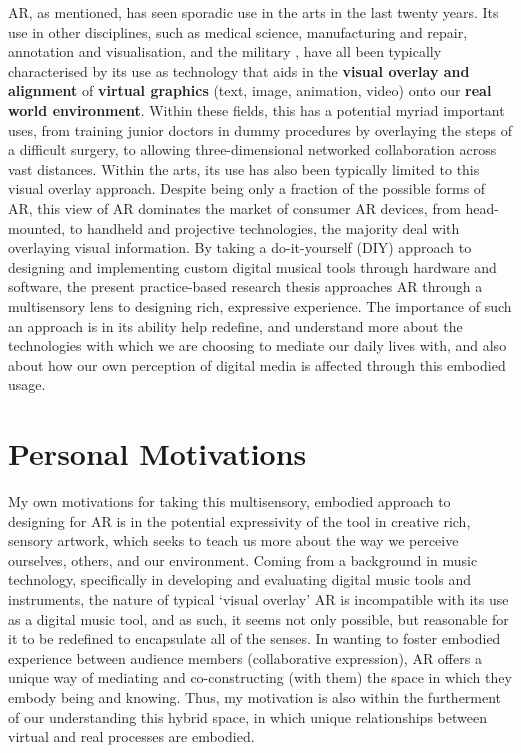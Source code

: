 AR, as mentioned, has seen sporadic use in the arts in the last twenty years. Its use in other disciplines, such as medical science, manufacturing and repair, annotation and visualisation, and the military \citep{azuma1997}, have all been typically characterised by its use as technology that aids in the \textbf{visual overlay and alignment} of \textbf{virtual graphics} (text, image, animation, video) onto our \textbf{real world environment}. Within these fields, this has a potential myriad important uses, from training junior doctors in dummy procedures by overlaying the steps of a difficult surgery, to allowing three-dimensional networked collaboration across vast distances. Within the arts, its use has also been typically limited to this visual overlay approach. Despite being only a fraction of the possible forms of AR, this view of AR dominates the market of consumer AR devices, from head-mounted, to handheld and projective technologies, the majority deal with overlaying visual information.  By taking a do-it-yourself (DIY) approach to designing and implementing custom digital musical tools through hardware and software, the present practice-based research thesis approaches AR through a multisensory lens to designing rich, expressive experience. The importance of such an approach is in its ability help redefine, and understand more about the technologies with which we are choosing to mediate our daily lives with, and also about how our own perception of digital media is affected through this embodied usage. 



\section{Personal Motivations}\label{sec: introduction-motivations}
My own motivations for taking this multisensory, embodied approach to designing for AR is in the potential expressivity of the tool in creative rich, sensory artwork, which seeks to teach us more about the way we perceive ourselves, others, and our environment. Coming from a background in music technology, specifically in developing and evaluating digital music tools and instruments, the nature of typical `visual overlay' AR is incompatible with its use as a digital music tool, and as such, it seems not only possible, but reasonable for it to be redefined to encapsulate all of the senses. In wanting to foster embodied experience between audience members (collaborative expression), AR offers a unique way of mediating and co-constructing (with them) the space in which they embody being and knowing. Thus, my motivation is also within the furtherment of our understanding this hybrid space, in which unique relationships between virtual and real processes are embodied.



